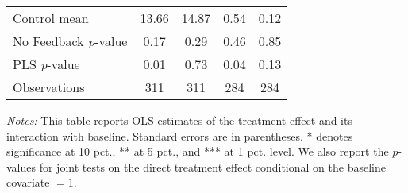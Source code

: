 \begin{table}[ht]
{\begin{threeparttable}
\begin{tabular}{l*{4}{c}}
Control mean    &    13.66         &    14.87         &     0.54         &     0.12         \\
No Feedback \emph{p}-value&     0.17         &     0.29         &     0.46         &     0.85         \\
PLS \emph{p}-value&     0.01         &     0.73         &     0.04         &     0.13         \\
Observations    &      311         &      311         &      284         &      284         \\
\bottomrule \end{tabular} \begin{tablenotes}[flushleft] \footnotesize \item \emph{Notes:} This table reports OLS estimates of the treatment effect and its interaction with baseline. Standard errors are in parentheses. * denotes significance at 10 pct., ** at 5 pct., and *** at 1 pct. level. We also report the \(p\)-values for joint tests on the direct treatment effect conditional on the baseline covariate $= 1$. \end{tablenotes} \end{threeparttable} } \end{table}

